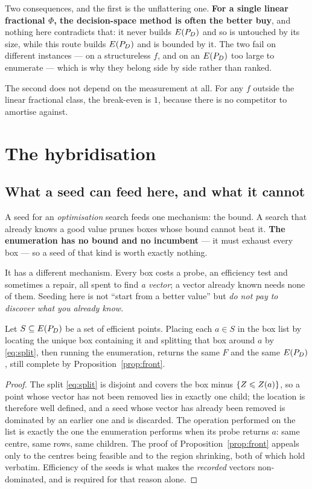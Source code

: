 \documentclass[11pt,a4paper]{article}
\begin{document}
Two consequences, and the first is the unflattering one.  \textbf{For a single
linear fractional $\Phi$, the decision-space method is often the better buy},
and nothing here contradicts that: it never builds $E(P_{D})$ and so is untouched by
its size, while this route builds $E(P_{D})$ and is bounded by it.  The two fail on
different instances --- on a structureless $f$, and on an $E(P_{D})$ too large to
enumerate --- which is why they belong side by side rather than ranked.

The second does not depend on the measurement at all.  For any $f$ outside the
linear fractional class, the break-even is $1$, because there is no competitor
to amortise against.

\section{The hybridisation}
\label{sec:hybrid}

\subsection{What a seed can feed here, and what it cannot}

A seed for an \emph{optimisation} search feeds one mechanism: the bound.  A
search that already knows a good value prunes boxes whose bound cannot beat it.
\textbf{The enumeration has no bound and no incumbent} --- it must exhaust every
box --- so a seed of that kind is worth exactly nothing.

It has a different mechanism.  Every box costs a probe, an efficiency test and
sometimes a repair, all spent to find \emph{a vector}; a vector already known
needs none of them.  Seeding here is not ``start from a better value'' but
\emph{do not pay to discover what you already know}.

\begin{proposition}\label{prop:seedsound}
Let $S \subseteq E(P_{D})$ be a set of efficient points.  Placing each $a \in S$ in
the box list by locating the unique box containing it and splitting that box
around $a$ by \eqref{eq:split}, then running the enumeration, returns the same
$F$ and the same $E(P_{D})$, still complete by Proposition~\ref{prop:front}.
\end{proposition}

\begin{proof}
The split \eqref{eq:split} is disjoint and covers the box minus
$\{Z \leqslant Z(a)\}$, so a point whose vector has not been removed lies in
exactly one child; the location is therefore well defined, and a seed whose
vector has already been removed is dominated by an earlier one and is
discarded.  The operation performed on the list is exactly the one the
enumeration performs when its probe returns $a$: same centre, same rows, same
children.  The proof of Proposition~\ref{prop:front} appeals only to the
centres being feasible and to the region shrinking, both of which hold
verbatim.  Efficiency of the seeds is what makes the \emph{recorded} vectors
non-dominated, and is required for that reason alone.
\end{proof}
\end{document}
